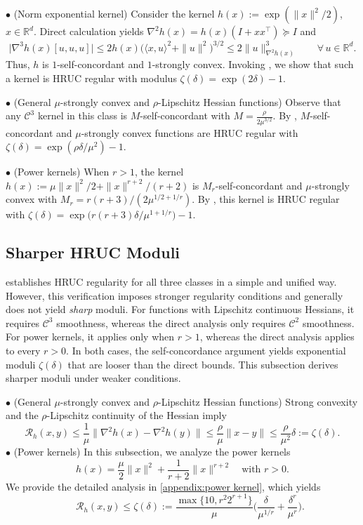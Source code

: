 \documentclass{article}
\theoremstyle{plain}
\theoremstyle{definition}
\theoremstyle{remark}
\newcommand{\cC}{\mathcal C}
\newcommand{\Rd}{\mathbb{R}^d}
\newcommand{\cR}{\mathcal{R}}
\begin{document}
\noindent $\bullet$ {(Norm exponential kernel)}
Consider the kernel $h(x):=\exp(\|x\|^2/2)$, $x\in\Rd$.
Direct calculation yields  $\nabla^2h(x)=h(x)(I+xx^\top)\succeq I$ and
\[
\big|\nabla^3h(x)[u,u,u]\big|
\leq2h(x)\big(\langle x,u\rangle^2+\|u\|^2\big)^{3/2}
\leq2\|u\|_{\nabla^2h(x)}^3\qquad \forall\,u\in\Rd.
\]
Thus, $h$ is $1$-self-concordant and $1$-strongly convex. Invoking , we show that such a kernel is HRUC regular with modulus $\zeta(\delta)=\exp(2\delta)-1$.\par\smallskip

\noindent $\bullet$ {(General $\mu$-strongly convex and $\rho$-Lipschitz Hessian functions)}
Observe that any $\cC^3$ kernel in this class is $M$-self-concordant with $M=\frac{\rho}{2\mu^{3/2}}$.
By , $M$-self-concordant and $\mu$-strongly convex functions are HRUC regular with $\zeta(\delta) = \exp(\rho\delta/{\mu^2})-1$.\par\smallskip

\noindent $\bullet$ {(Power kernels)}
When $r>1$, the kernel $h(x):=\mu\|x\|^2/2+\|x\|^{r+2}/(r+2)$ is $M_r$-self-concordant and $\mu$-strongly convex with $M_r=r(r+3)/(2\mu^{1/2+1/r})$. By , this kernel is HRUC regular with $\zeta(\delta)=\exp\big(r(r+3)\delta/\mu^{1+1/r}\big)-1$.\par\smallskip

\subsection{Sharper HRUC Moduli}\label{subsec:power kernel}
 establishes HRUC regularity for all three classes in a simple and unified way. However, this verification imposes stronger regularity conditions and generally does not yield \emph{sharp} moduli. For functions with Lipschitz continuous Hessians, it requires $\cC^3$ smoothness, whereas the direct analysis only requires $\cC^2$ smoothness. For power kernels, it applies only when $r>1$, whereas the direct analysis applies to every $r>0$. In both cases, the self-concordance argument yields exponential moduli $\zeta(\delta)$ that are looser than the direct bounds. This subsection derives sharper moduli under weaker conditions.
\smallskip

\noindent $\bullet$ {(General $\mu$-strongly convex and $\rho$-Lipschitz Hessian functions)} Strong convexity and the $\rho$-Lipschitz continuity of the Hessian imply
\[
\cR_h(x,y)
\leq \frac{1}{\mu}\big\|\nabla^2h(x)-\nabla^2h(y)\big\|
\leq \frac{\rho}{\mu}\|x-y\|
\leq \frac{\rho}{\mu^2}\delta:=\zeta(\delta).
\]
\noindent $\bullet$ {(Power kernels)} In this subsection, we analyze the power kernels
\[h(x)=\frac{\mu}{2}\|x\|^2 + \frac{1}{r+2}\|x\|^{r+2} \quad \text{with $r>0$.}\] We provide the detailed analysis in \cref{appendix:power kernel}, which yields
\[
\hspace{3cm}\cR_h(x,y) \leq \zeta(\delta):=\frac{\max\{10, r^2 2^{r+1}\}}{\mu}\Big(\frac{\delta}{\mu^{1/r}}+\frac{\delta^r}{\mu^r}\Big). \hspace{3cm}
\]
\end{document}
